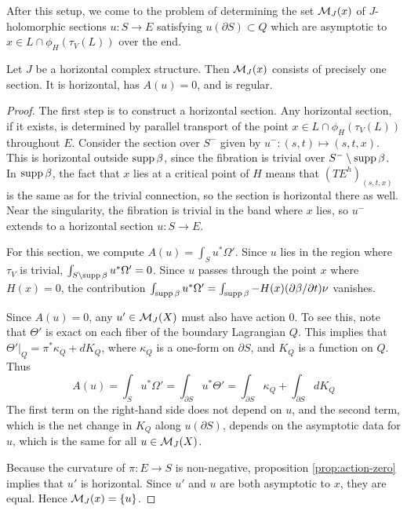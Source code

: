 \documentclass[12pt]{amsart}
\begin{document}
After this setup, we come to the problem of determining the set
$\mathcal{M}_J(x)$ of $J$-holomorphic sections $u: S \to E$ satisfying $u(\partial S) \subset Q$ which are
asymptotic to $x \in L \cap \phi_H(\tau_V(L))$ over the end.

\begin{proposition}
  \label{prop:horiz-sections}
  Let $J$ be a horizontal complex structure. Then $\mathcal{M}_J(x)$ consists
  of precisely one section. It is horizontal, has $A(u) = 0$, and is regular.
\end{proposition}

\begin{proof}
  The first step is to construct a horizontal section. Any horizontal
  section, if it exists, is determined by parallel transport of the
  point $x \in L\cap \phi_H(\tau_V(L))$ throughout $E$. Consider the
  section over $S^-$ given by $u^-: (s,t) \mapsto (s,t,x)$. This is
  horizontal outside $\operatorname{supp} \beta$, since the fibration is trivial
  over $S^- \setminus \operatorname{supp} \beta$. In $\operatorname{supp} \beta$, the fact that
  $x$ lies at a critical point of $H$ means that $(TE^h)_{(s,t,x)}$ is
  the same as for the trivial connection, so the section is horizontal
  there as well. Near the singularity, the fibration is trivial in the
  band where $x$ lies, so $u^-$ extends to a horizontal section $u: S
  \to E$.

  For this section, we compute $A(u) = \int_S u^*\Omega'$. Since $u$
  lies in the region where $\tau_V$ is trivial, $\int_{S \setminus
    \operatorname{supp} \beta} u^* \Omega' = 0$. Since $u$ passes through the point
  $x$ where $H(x) = 0$, the contribution $\int_{\operatorname{supp} \beta}
  u^*\Omega' = \int_{\operatorname{supp} \beta} -H(x)(\partial \beta/\partial t)\nu$
  vanishes.

  Since $A(u) = 0$, any $u' \in \mathcal{M}_J(X)$ must also have action
  $0$. To see this, note that $\Theta'$ is exact on each fiber of the boundary Lagrangian $Q$. This implies that $\Theta'|_Q = \pi^*\kappa_Q + dK_Q$, where $\kappa_Q$ is a one-form on $\partial S$, and $K_Q$ is a function on $Q$. Thus
  \begin{equation}
    A(u) = \int_S u^*\Omega' = \int_{\partial S} u^*\Theta' = \int_{\partial S} \kappa_Q + \int_{\partial S} dK_Q
  \end{equation}
  The first term on the right-hand side does not depend on $u$, and the second term, which is the net change in $K_Q$ along $u(\partial S)$, depends on the asymptotic data for $u$, which is the same for all $u \in \mathcal{M}_J(X)$.

  Because the curvature of $\pi: E\to S$ is non-negative,
  proposition \ref{prop:action-zero} implies that $u'$ is
  horizontal. Since $u'$ and $u$ are both asymptotic to $x$, they are
  equal. Hence $\mathcal{M}_J(x) = \{u\}$.


\end{proof}
\end{document}
